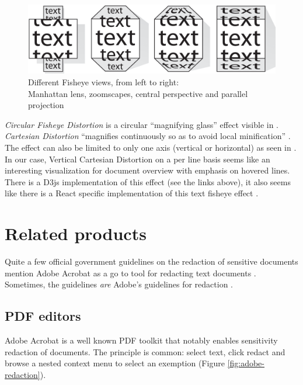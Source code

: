 \documentclass{l4proj}
\begin{document}
\begin{figure}[H]
    \centering
    \includegraphics[width=\textwidth]{images/document_visualization/different-fisheyes.png}
    \caption{Different Fisheye views, from left to right: \\ Manhattan lens, zoomscapes, central perspective and parallel projection \\ \protect\autocite{baudischFishnetFisheyeWeb2004}}
    \label{fig:fisheyes}
\end{figure}

\textit{Circular Fisheye Distortion} is a circular ``magnifying glass'' effect visible in \textcite{bostockFisheyeGrid2019}. \textit{Cartesian Distortion} ``magnifies continuously so as to avoid local minification'' \autocite{bostockFisheyeDistortion2012}. The effect can also be limited to only one axis (vertical or horizontal) as seen in \textcite{pstuffaCartesianFisheyeDistortion2019}. In our case, Vertical Cartesian Distortion on a per line basis seems like an interesting visualization for document overview with emphasis on hovered lines. There is a D3js implementation of this effect (see the links above), it also seems like there is a React specific implementation of this text fisheye effect \autocite{zhongVincentdchanReactfisheye2019}.

\section{Related products}

Quite a few official government guidelines on the redaction of sensitive documents mention Adobe Acrobat as a go to tool for redacting text documents \autocite{thenationalarchivesRedactionToolkitPaper2016}.
Sometimes, the guidelines \textit{are} Adobe's guidelines for redaction \autocite{scottishgovernmentRedactingInformation2019}.

\subsection{PDF editors}

Adobe Acrobat is a well known PDF toolkit that notably enables sensitivity redaction of documents.
The principle is common: select text, click redact and browse a nested context menu to select an exemption (Figure \ref{fig:adobe-redaction}).
\end{document}
